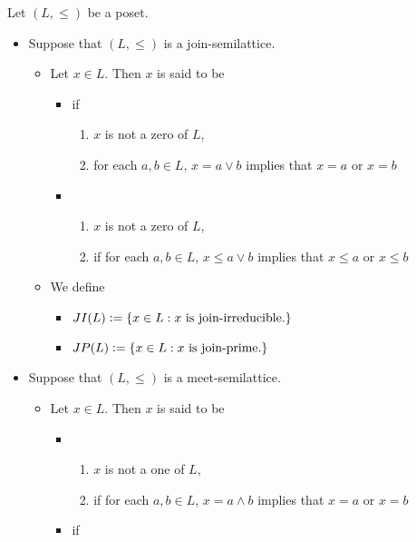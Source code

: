 \documentclass{book}
\begin{document}
	\begin{defn}
		Let $(L, \leq)$ be a poset.
		\begin{itemize}
			\item Suppose that $(L, \leq)$ is a join-semilattice.
			\begin{itemize}
				\item Let $x \in L$. Then $x$ is said to be
				\begin{itemize}
					\item {} if 
					\begin{enumerate}
						\item $x$ is not a zero of $L$,
						\item for each $a,b \in L$, $x = a \vee b$ implies that $x = a$ or $x = b$ 
					\end{enumerate}
					\item {}
					\begin{enumerate}
						\item $x$ is not a zero of $L$,
						\item if for each $a,b \in L$, $x \leq a \vee b$ implies that $x \leq a$ or $x \leq b$
					\end{enumerate}
				\end{itemize}
				\item We define 
				\begin{itemize}
					\item $JI(L) \vcentcolon= \{x \in L: \text{$x$ is join-irreducible.}\}$
					\item $JP(L) \vcentcolon= \{x \in L: \text{$x$ is join-prime.}\}$
				\end{itemize}
			\end{itemize}
			\item Suppose that $(L, \leq)$ is a meet-semilattice. 
			\begin{itemize}
				\item Let $x \in L$. Then $x$ is said to be 
				\begin{itemize}
					\item {} 
					\begin{enumerate}
						\item $x$ is not a one of $L$,
						\item if for each $a,b \in L$, $x = a \wedge b$ implies that $x = a$ or $x = b$ 
					\end{enumerate}
					\item {} if
					\begin{enumerate}

\end{enumerate}
\end{itemize}
\end{itemize}
\end{itemize}
\end{defn}
\end{document}
